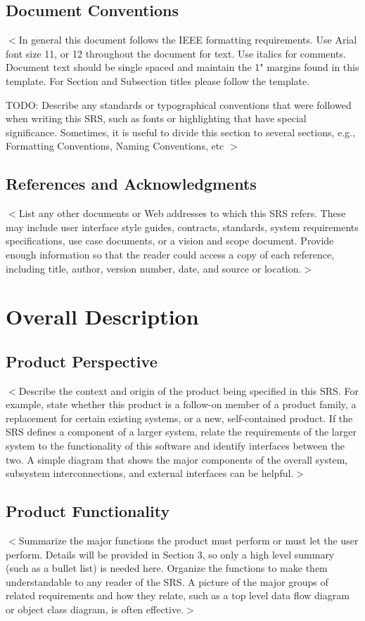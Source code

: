 \documentclass[a4paper, 11pt]{scrreprt}
\begin{document}
\section{Document Conventions}
$<$In general this document follows the IEEE formatting requirements. Use Arial font size 11, or 12 throughout the document for text. Use italics for comments. Document text should be single spaced and maintain the 1" margins found in this template. For Section and Subsection titles please follow the template. 

TODO: Describe any standards or typographical conventions that were followed when writing this SRS, such as fonts or highlighting that have special significance. Sometimes, it is useful to divide this section to several sections, e.g., Formatting Conventions, Naming Conventions, etc
$>$

\section{References and Acknowledgments}
$<$List any other documents or Web addresses to which this SRS refers. These may 
include user interface style guides, contracts, standards, system requirements 
specifications, use case documents, or a vision and scope document. Provide 
enough information so that the reader could access a copy of each reference, 
including title, author, version number, date, and source or location.$>$

\chapter{Overall Description}

\section{Product Perspective}
$<$Describe the context and origin of the product being specified in this SRS.  
For example, state whether this product is a follow-on member of a product 
family, a replacement for certain existing systems, or a new, self-contained 
product. If the SRS defines a component of a larger system, relate the 
requirements of the larger system to the functionality of this software and 
identify interfaces between the two. A simple diagram that shows the major 
components of the overall system, subsystem interconnections, and external 
interfaces can be helpful.$>$

\section{Product Functionality}
$<$Summarize the major functions the product must perform or must let the user 
perform. Details will be provided in Section 3, so only a high level summary 
(such as a bullet list) is needed here. Organize the functions to make them 
understandable to any reader of the SRS. A picture of the major groups of 
related requirements and how they relate, such as a top level data flow diagram 
or object class diagram, is often effective.$>$
\end{document}
